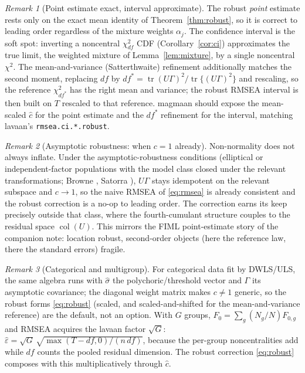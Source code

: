 \documentclass[11pt]{article}
\newcommand{\tr}{\operatorname{tr}}
\newcommand{\rmsea}{\widehat{\varepsilon}}
\theoremstyle{plain}
\theoremstyle{remark}
\newtheorem*{remark}{Remark}
\begin{document}
\begin{remark}[Point estimate exact, interval approximate]
The robust \emph{point} estimate rests only on the exact mean identity of
Theorem~\ref{thm:robust}, so it is correct to leading order regardless of the
mixture weights $\alpha_j$. The confidence interval is the soft spot: inverting
a noncentral $\chi^2_{df}$ CDF (Corollary~\ref{cor:ci}) approximates the true
limit, the weighted mixture of Lemma~\ref{lem:mixture}, by a single noncentral
$\chi^2$. The mean-and-variance (Satterthwaite) refinement additionally matches
the second moment, replacing $df$ by
$df^\ast=\tr(U\Gamma)^2/\tr\{(U\Gamma)^2\}$ and rescaling, so the reference
$\chi^2_{df^\ast}$ has the right mean and variance; the robust RMSEA interval is
then built on $T$ rescaled to that reference. magmaan should expose the
mean-scaled $\hat c$ for the point estimate and the $df^\ast$ refinement for the
interval, matching lavaan's \texttt{rmsea.ci.*.robust}.
\end{remark}

\begin{remark}[Asymptotic robustness: when $c=1$ already]
Non-normality does not always inflate. Under the asymptotic-robustness
conditions (elliptical or independent-factor populations with the model class
closed under the relevant transformations; Browne \cite{browne1984}, Satorra
\cite{satorra1989}), $U\Gamma$ stays idempotent on the relevant subspace and
$c\to1$, so the naive RMSEA of \eqref{eq:rmsea} is already consistent and the
robust correction is a no-op to leading order. The correction earns its keep
precisely outside that class, where the fourth-cumulant structure couples to the
residual space $\operatorname{col}(U)$. This mirrors the FIML point-estimate
story of the companion note: location robust, second-order objects (here the
reference law, there the standard errors) fragile.
\end{remark}

\begin{remark}[Categorical and multigroup]
For categorical data fit by DWLS/ULS, the same algebra runs with $\hat\sigma$
the polychoric/threshold vector and $\Gamma$ its asymptotic covariance; the
diagonal weight matrix makes $c\ne1$ generic, so the robust forms
\eqref{eq:robust} (scaled, and scaled-and-shifted for the
mean-and-variance reference) are the default, not an option. With $G$ groups,
$F_0=\sum_g (N_g/N)F_{0,g}$ and RMSEA acquires the lavaan factor
$\sqrt{G}$: $\rmsea=\sqrt{G}\,\sqrt{\max(T-df,0)/(n\,df)}$, because the
per-group noncentralities add while $df$ counts the pooled residual dimension.
The robust correction \eqref{eq:robust} composes with this multiplicatively
through $\hat c$.
\end{remark}
\end{document}
